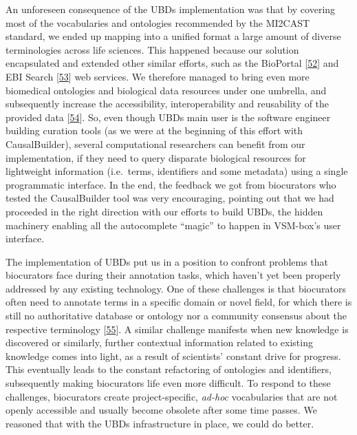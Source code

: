 \documentclass[
  12pt,
]{book}
\begin{document}
An unforeseen consequence of the UBDs implementation was that by covering most of the vocabularies and ontologies recommended by the MI2CAST standard, we ended up mapping into a unified format a large amount of diverse terminologies across life sciences.
This happened because our solution encapsulated and extended other similar efforts, such as the BioPortal {[}\protect\hyperlink{ref-Whetzel2011}{52}{]} and EBI Search {[}\protect\hyperlink{ref-Madeira2019}{53}{]} web services.
We therefore managed to bring even more biomedical ontologies and biological data resources under one umbrella, and subsequently increase the accessibility, interoperability and reusability of the provided data {[}\protect\hyperlink{ref-Wilkinson2016}{54}{]}.
So, even though UBDs main user is the software engineer building curation tools (as we were at the beginning of this effort with CausalBuilder), several computational researchers can benefit from our implementation, if they need to query disparate biological resources for lightweight information (i.e.~terms, identifiers and some metadata) using a single programmatic interface.
In the end, the feedback we got from biocurators who tested the CausalBuilder tool was very encouraging, pointing out that we had proceeded in the right direction with our efforts to build UBDs, the hidden machinery enabling all the autocomplete ``magic'' to happen in VSM-box's user interface.

The implementation of UBDs put us in a position to confront problems that biocurators face during their annotation tasks, which haven't yet been properly addressed by any existing technology.
One of these challenges is that biocurators often need to annotate terms in a specific domain or novel field, for which there is still no authoritative database or ontology nor a community consensus about the respective terminology {[}\protect\hyperlink{ref-Hartmann2019}{55}{]}.
A similar challenge manifests when new knowledge is discovered or similarly, further contextual information related to existing knowledge comes into light, as a result of scientists' constant drive for progress.
This eventually leads to the constant refactoring of ontologies and identifiers, subsequently making biocurators life even more difficult.
To respond to these challenges, biocurators create project-specific, \emph{ad-hoc} vocabularies that are not openly accessible and usually become obsolete after some time passes.
We reasoned that with the UBDs infrastructure in place, we could do better.
\end{document}
